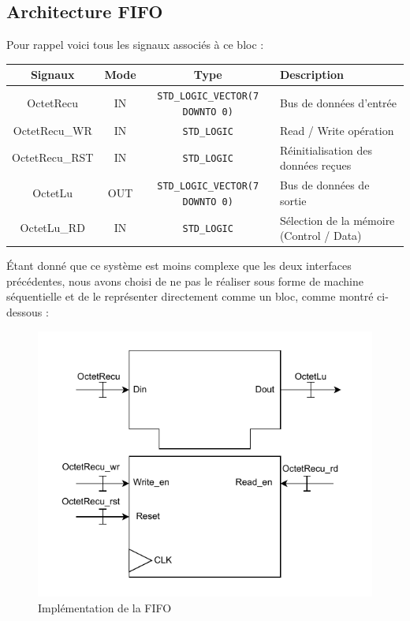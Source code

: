\subsection{Architecture FIFO}

Pour rappel voici tous les signaux associés à ce bloc : 
\newline

\begin{center}
\renewcommand{\arraystretch}{1.2} %
\small %
    \begin{tabularx}{\textwidth}{|c||c|c|X|}
     \hline				
       \textbf{Signaux} & \textbf{Mode} & \textbf{Type} & \textbf{Description}  \\ \hline 
       OctetRecu & IN & \texttt{STD\_LOGIC\_VECTOR(7 DOWNTO 0)} & Bus de données d'entrée \\
       OctetRecu\_WR & IN & \texttt{STD\_LOGIC} & Read / Write opération \\
       OctetRecu\_RST & IN & \texttt{STD\_LOGIC} & Réinitialisation des données reçues \\
       OctetLu & OUT & \texttt{STD\_LOGIC\_VECTOR(7 DOWNTO 0)} & Bus de données de sortie \\
       OctetLu\_RD & IN & \texttt{STD\_LOGIC} & Sélection de la mémoire (Control / Data) \\
     \hline  
    \end{tabularx}
\end{center}

Étant donné que ce système est moins complexe que les deux interfaces précédentes, nous avons choisi de ne pas le réaliser sous forme de machine séquentielle et de le représenter directement comme un bloc, comme montré ci-dessous : 
\newline

\begin{figure}[H]
    \centering
    \includegraphics[width=0.8\linewidth]{images/inter/Implementation_FIFO.pdf}
    \caption{Implémentation de la FIFO}
    \label{fig:placeholder}
\end{figure}

